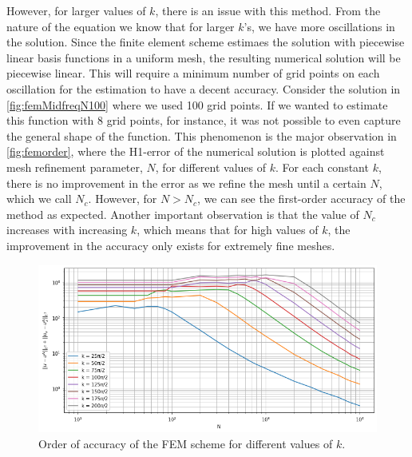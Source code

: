 However, for larger values of $k$, there is an issue with this method. From the nature of the equation we know that for larger $k$'s, we have more oscillations in the solution. Since the finite element scheme estimaes the solution with piecewise linear basis functions in a uniform mesh, the resulting numerical solution will be piecewise linear. This will require a minimum number of grid points on each oscillation for the estimation to have a decent accuracy. Consider the solution in \autoref{fig:femMidfreqN100} where we used 100 grid points. If we wanted to estimate this function with 8 grid points, for instance, it was not possible to even capture the general shape of the function. This phenomenon is the major observation in \autoref{fig:femorder}, where the H1-error of the numerical solution is plotted against mesh refinement parameter, $N$, for different values of $k$. For each constant $k$, there is no improvement in the error as we refine the mesh until a certain $N$, which we call $N_c$. However, for $N > N_c$, we can see the first-order accuracy of the method as expected. Another important observation is that the value of $N_c$ increases with increasing $k$, which means that for high values of $k$, the improvement in the accuracy only exists for extremely fine meshes.

\begin{figure}[h!]
    \centering
    \includegraphics[width=.7\textwidth]{img/FEM-Order-Homog-H1.png}
    \caption{Order of accuracy of the FEM scheme for different values of $k$.}
    \label{fig:femorder}
\end{figure}

